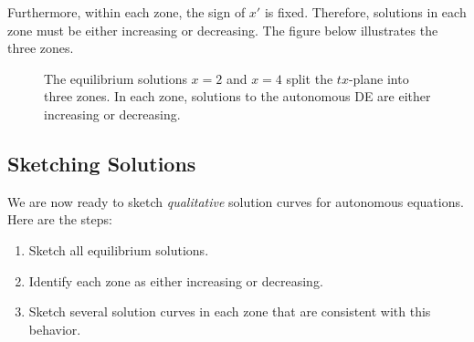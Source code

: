 \documentclass[09pt,letterpaper]{article}
\begin{document}
Furthermore, within each zone, the sign of $x'$ is fixed. Therefore, solutions in each zone must be either increasing or decreasing. The figure below illustrates the three zones.

\begin{figure}[H]
    \centering
{}
\caption{The equilibrium solutions $x=2$ and $x=4$ split the $tx$-plane into three zones. In each zone, solutions to the autonomous DE are either increasing or decreasing.}
\end{figure}

\subsection{Sketching Solutions}
We are now ready to sketch \textit{qualitative} solution curves for autonomous equations. Here are the steps: 
\begin{enumerate}
    \item Sketch all equilibrium solutions.
    \item Identify each zone as either increasing or decreasing.
    \item Sketch several solution curves in each zone that are consistent with this behavior.
\end{enumerate}
\end{document}
